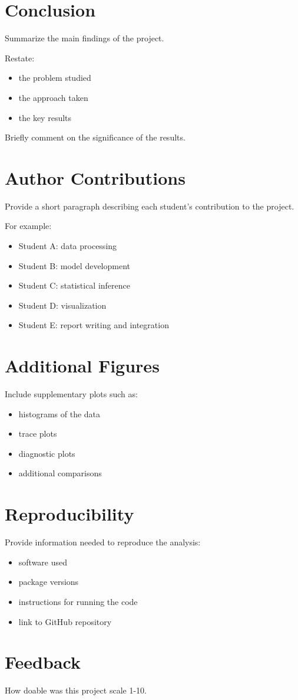 \documentclass[11pt]{article}
\begin{document}
\section{Conclusion}

Summarize the main findings of the project.

Restate:
\begin{itemize}
\item the problem studied
\item the approach taken
\item the key results
\end{itemize}

Briefly comment on the significance of the results.

\section*{Author Contributions}

Provide a short paragraph describing each student's contribution
to the project.

For example:
\begin{itemize}
\item Student A: data processing
\item Student B: model development
\item Student C: statistical inference
\item Student D: visualization
\item Student E: report writing and integration
\end{itemize}


\printbibliography

\appendix

\section{Additional Figures}

Include supplementary plots such as:
\begin{itemize}
\item histograms of the data
\item trace plots
\item diagnostic plots
\item additional comparisons
\end{itemize}

\section{Reproducibility}

Provide information needed to reproduce the analysis:
\begin{itemize}
\item software used
\item package versions
\item instructions for running the code
\item link to GitHub repository
\end{itemize}

\section{Feedback}
How doable was this project scale 1-10.
\end{document}

